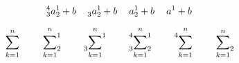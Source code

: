 \documentclass[10pt,a4paper]{article}
\newcommand{\paramCt}[5]{
		\prescript{#5}{#4}{#1}^{#2}_{#3}
	}
\newcommand{\paramOpe}[5]{
		\sideset{_{#4}^{#5}}{_{#3}^{#2}} #1
	}
\begin{document}
\[
	\paramCt{ a }{1}{2}{3}{4} + b   \quad
	\paramCt{ a }{1}{2}{3}{} + b   \quad
	\paramCt{ a }{1}{2}{}{} + b   \quad
	\paramCt{ a }{1}{}{}{} + b
\]

\[
	\paramOpe{ \sum_{k = 1}^{n} }{}{}{}{} \qquad
	\paramOpe{ \sum_{k = 1}^{n} }{1}{2}{}{} \qquad
	\paramOpe{ \sum_{k = 1}^{n} }{1}{}{3}{} \qquad
	\paramOpe{ \sum_{k = 1}^{n} }{1}{2}{3}{4} \qquad
	\paramOpe{ \sum_{k = 1}^{n} }{}{}{}{4} \qquad
	\paramOpe{ \sum_{k = 1}^{n} }{}{2}{}{}
\]
\end{document}
